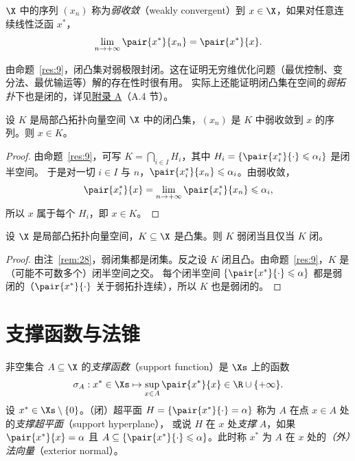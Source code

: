 \begin{definition}[弱收敛]
\label{def:8}
$\X$ 中的序列 $(x_n)$ 称为\emph{弱收敛}（weakly convergent）到 $x\in\X$，如果对任意连续线性泛函 $x^*$，
\[
  \lim_{n\to+\infty}\pair{x^*}{x_n}=\pair{x^*}{x}.
\]
\end{definition}

由命题~\ref{res:9}，闭凸集对弱极限封闭。这在证明无穷维优化问题（最优控制、变分法、最优输运等）解的存在性时很有用。
实际上还能证明闭凸集在空间的\emph{弱拓扑}下也是闭的，详见\hyperref[ch:appA]{附录 A}（A.4 节）。

\begin{corollary}
\label{res:11}
设 $K$ 是局部凸拓扑向量空间 $\X$ 中的闭凸集，$(x_n)$ 是 $K$ 中弱收敛到 $x$ 的序列。则 $x\in K$。
\end{corollary}

\begin{proof}
由命题~\ref{res:9}，可写 $K=\bigcap_{i\in I}H_i$，其中 $H_i=\{\pair{x_i^*}{\cdot}\leqslant\alpha_i\}$ 是闭半空间。
于是对一切 $i\in I$ 与 $n$，$\pair{x_i^*}{x_n}\leqslant\alpha_i$。由弱收敛，
\[
  \pair{x_i^*}{x}=\lim_{n\to+\infty}\pair{x_i^*}{x_n}\leqslant\alpha_i ,
\]
所以 $x$ 属于每个 $H_i$，即 $x\in K$。
\end{proof}

\begin{proposition}
\label{res:12}
设 $\X$ 是局部凸拓扑向量空间，$K\subseteq\X$ 是凸集。则 $K$ 弱闭当且仅当 $K$ 闭。
\end{proposition}

\begin{proof}
由注~\ref{rem:28}，弱闭集都是闭集。反之设 $K$ 闭且凸。由命题~\ref{res:9}，$K$ 是（可能不可数多个）闭半空间之交。
每个闭半空间 $\{\pair{x^*}{\cdot}\leqslant\alpha\}$ 都是弱闭的（$\pair{x^*}{\cdot}$ 关于弱拓扑连续），所以 $K$ 也是弱闭的。
\end{proof}

\section{支撑函数与法锥}

\begin{definition}
\label{def:9}
非空集合 $A\subseteq\X$ 的\emph{支撑函数}（support function）是 $\Xs$ 上的函数
\begin{equation}
  \label{eq:3}
  \sigma_A:x^*\in\Xs\mapsto\sup_{x\in A}\pair{x^*}{x}\in\R\cup\{+\infty\}.
\end{equation}
设 $x^*\in\Xs\setminus\{0\}$。（闭）超平面 $H=\{\pair{x^*}{\cdot}=\alpha\}$ 称为 $A$ 在点 $x\in A$ 处的\emph{支撑超平面}（support hyperplane），
或说 $H$ 在 $x$ 处\emph{支撑} $A$，如果 $\pair{x^*}{x}=\alpha$ 且 $A\subseteq\{\pair{x^*}{\cdot}\leqslant\alpha\}$。此时称 $x^*$ 为 $A$ 在 $x$ 处的\emph{（外）法向量}（exterior normal）。
\end{definition}

